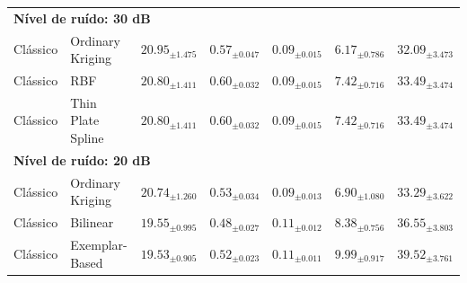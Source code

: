 \begin{table}[htbp]
{\begin{tabular}{llccccc}
\midrule
\multicolumn{7}{l}{\textbf{Nível de ruído: 30 dB}} \\
Clássico & Ordinary Kriging & $\mathbf{20.95_{\pm 1.475}}$ & $0.57_{\pm 0.047}$ & $\mathbf{0.09_{\pm 0.015}}$ & $6.17_{\pm 0.786}$ & $32.09_{\pm 3.473}$ \\
Clássico & RBF & $20.80_{\pm 1.411}$ & $0.60_{\pm 0.032}$ & $0.09_{\pm 0.015}$ & $7.42_{\pm 0.716}$ & $33.49_{\pm 3.474}$ \\
Clássico & Thin Plate Spline & $20.80_{\pm 1.411}$ & $0.60_{\pm 0.032}$ & $0.09_{\pm 0.015}$ & $7.42_{\pm 0.716}$ & $33.49_{\pm 3.474}$ \\
\midrule
\multicolumn{7}{l}{\textbf{Nível de ruído: 20 dB}} \\
Clássico & Ordinary Kriging & $\mathbf{20.74_{\pm 1.260}}$ & $\mathbf{0.53_{\pm 0.034}}$ & $\mathbf{0.09_{\pm 0.013}}$ & $\mathbf{6.90_{\pm 1.080}}$ & $\mathbf{33.29_{\pm 3.622}}$ \\
Clássico & Bilinear & $19.55_{\pm 0.995}$ & $0.48_{\pm 0.027}$ & $0.11_{\pm 0.012}$ & $8.38_{\pm 0.756}$ & $36.55_{\pm 3.803}$ \\
Clássico & Exemplar-Based & $19.53_{\pm 0.905}$ & $0.52_{\pm 0.023}$ & $0.11_{\pm 0.011}$ & $9.99_{\pm 0.917}$ & $39.52_{\pm 3.761}$ \\
\bottomrule
\end{tabular}
}
\end{table}
